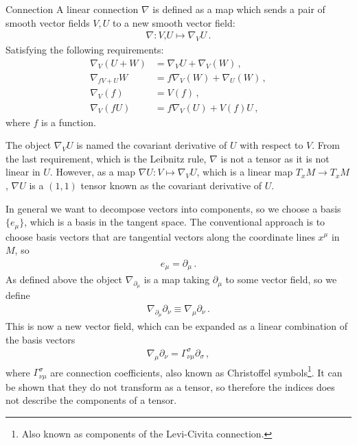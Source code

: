 \medskip
\begin{mydef}{Connection}{}
A linear connection $\nabla$ is defined as a map which sends a pair of smooth vector fields $V,U$ to a new smooth vector field:
\begin{align}
    \nabla: V\text{,}U\mapsto \nabla_{V}U\,.
\end{align}
Satisfying the following requirements:
\begin{align}
    \nabla_{V}(U+W)&=\nabla_{V}U+\nabla_{V}(W)\,,
    \\
    \nabla_{fV+U}W&=f\nabla_{V}(W)+\nabla_{U}(W)\,,
    \\
    \nabla_{V}(f)&=V(f)\,,
    \\
    \nabla_{V}(fU)&=f\nabla_{V}(U)+V(f)U\,,
\end{align}
where $f$ is a function.
\end{mydef}\noindent
The object $\nabla_{V}U$ is named the covariant derivative of $U$ with respect to $V$. From the last requirement, which is the Leibnitz rule, $\nabla$ is not a tensor as it is not linear in $U$. However, as a map $\nabla U:V\mapsto \nabla_{V}U$, which is a linear map $T_{x}M\rightarrow T_{x}M$, $\nabla U$ is a $(1,1)$ tensor known as the covariant derivative of $U$.

\medskip
In general we want to decompose vectors into components, so we choose a basis $\{e_{\mu}\}$, which is a basis in the tangent space. The conventional approach is to choose basis vectors that are tangential vectors along the coordinate lines $x^{\mu}$ in $M$, so
\begin{align}
    e_{\mu}=\partial_{\mu}\,.
\end{align}
As defined above the object $\nabla_{\partial_{\mu}}$ is a map taking $\partial_{\mu}$ to some vector field, so we define
\begin{align}
    \nabla_{\partial_{\mu}}\partial_{\nu}\equiv\nabla_{\mu}\partial_{\nu}\,.
\end{align}
This is now a new vector field, which can be expanded as a linear combination of the basis vectors
\begin{align}
    \nabla_{\mu}\partial_{\nu}=\Gamma^{\sigma}_{\nu\mu}\partial_{\sigma}\,,
\end{align}
where $\Gamma^{\sigma}_{\nu\mu}$ are connection coefficients, also known as Christoffel symbols\footnote{Also known as components of the Levi-Civita connection.}. It can be shown that they do not transform as a tensor, so therefore the indices does not describe the components of a tensor. 

